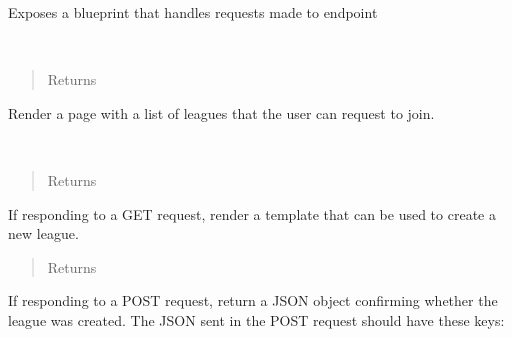 \documentclass[letterpaper,10pt,english]{sphinxmanual}
\begin{document}
Exposes a blueprint that handles requests made to  endpoint

\begin{fulllineitems}
\label{\detokenize{tiger_leagues/readme:tiger_leagues.league.browse_leagues}}~\begin{quote}\begin{description}
\item[{Returns}] \leavevmode
{}

\end{description}\end{quote}

Render a page with a list of leagues that the user can request to join.

\end{fulllineitems}


\begin{fulllineitems}
\label{\detokenize{tiger_leagues/readme:tiger_leagues.league.create_league}}~\begin{quote}\begin{description}
\item[{Returns}] \leavevmode
{}

\end{description}\end{quote}

If responding to a GET request, render a template that can be used to 
create a new league.
\begin{quote}\begin{description}
\item[{Returns}] \leavevmode
{}

\end{description}\end{quote}

If responding to a POST request, return a JSON object confirming whether 
the league was created. The JSON sent in the POST request should have these 
keys: 

\end{fulllineitems}
\end{document}
